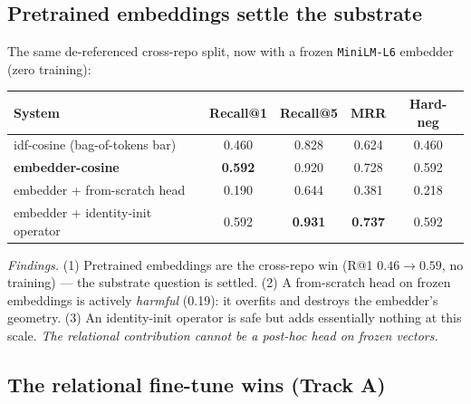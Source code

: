 \documentclass[11pt]{article}
\newcommand{\code}[1]{\texttt{#1}}
\begin{document}
\subsection{Pretrained embeddings settle the substrate}

The same de-referenced cross-repo split, now with a frozen \code{MiniLM-L6} embedder
(zero training):
\begin{center}
\begin{tabular}{lcccc}
\toprule
System & Recall@1 & Recall@5 & MRR & Hard-neg \\
\midrule
idf-cosine (bag-of-tokens bar) & 0.460 & 0.828 & 0.624 & 0.460 \\
\textbf{embedder-cosine} & \textbf{0.592} & 0.920 & 0.728 & 0.592 \\
embedder + from-scratch head & 0.190 & 0.644 & 0.381 & 0.218 \\
embedder + identity-init operator & 0.592 & \textbf{0.931} & \textbf{0.737} & 0.592 \\
\bottomrule
\end{tabular}
\end{center}
\emph{Findings.} (1) Pretrained embeddings are the cross-repo win (R@1 $0.46 \to
0.59$, no training) --- the substrate question is settled. (2) A from-scratch head on
frozen embeddings is actively \emph{harmful} (0.19): it overfits and destroys the
embedder's geometry. (3) An identity-init operator is safe but adds essentially
nothing at this scale. \emph{The relational contribution cannot be a post-hoc head on
frozen vectors.}

\subsection{The relational fine-tune wins (Track A)}
\end{document}
